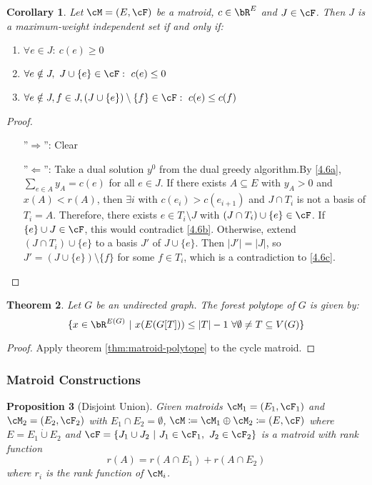 \documentclass[11pt, a4paper]{article}
\newcommand{\abs}[1]{\left\lvert#1\right\rvert}
\newcommand{\set}[1]{\{#1\}}
\newtheorem{theorem}{Theorem}[section]
\newtheorem{cor}[theorem]{Corollary}
\newtheorem{prop}[theorem]{Proposition}
\theoremstyle{remark}
\theoremstyle{definition}
\begin{document}
\begin{cor}
	Let $\cM=(E,\cF)$ be a matroid, $c\in\bR^E$ and $J\in\cF$. Then $J$ is
	a maximum-weight independent set if and only if:
	\begin{enumerate}[label=\alph*)]
		\item\label{4.6a} $\forall e\in J:\ c(e)\geq0$
		\item\label{4.6b} $\forall e\notin J,\ J\cup\set{e}\in\cF:\ c(e)\leq0$
		\item\label{4.6c} $\forall e\notin J, f\in J, (J\cup\set{e})\setminus\set{f}\in\cF:
			\ c(e)\leq c(f)$
	\end{enumerate}
\end{cor}
\begin{proof}\
	\begin{enumerate}
		\item[''$\Rightarrow$'':] Clear
		\item[''$\Leftarrow$'':] Take a dual solution $y^0$
		from the dual greedy algorithm.By \ref{4.6a}, $\sum_{e\in A}y_A=c(e)$
		for all $e\in J$. If there exists $A\subseteq E$ with $y_A>0$ and
		$x(A)<r(A)$, then $\exists i$ with $c(e_i)>c(e_{i+1})$ and
		$J\cap T_i$ is not a basis of $T_i=A$. Therefore, there exists
		$e\in T_i\setminus J$ with $(J\cap T_i)\cup\set{e}\in \cF$. If
		$\set{e}\cup J\in\cF$, this would contradict \ref{4.6b}. Otherwise,
		extend $(J\cap T_i)\cup\set{e}$ to a basis $J'$ of $J\cup\set{e}$. Then
		$\abs{J'}=\abs{J}$, so $J'=(J\cup\set{e})\setminus\set{f}$ for some
		$f\in T_i$, which is a contradiction to \ref{4.6c}.
	\end{enumerate}
\end{proof}


\begin{theorem}
	Let $G$ be an undirected graph. The forest polytope of $G$ is given by:
	\[\set{x\in\bR^{E(G)}\ |\ x(E(G[T]))\leq \abs{T}-1\ \forall \emptyset\neq T\subseteq V(G)}\]
\end{theorem}
\begin{proof}
	Apply theorem \ref{thm:matroid-polytope} to the cycle matroid.
\end{proof}

\subsubsection{Matroid Constructions}
\begin{prop}[Disjoint Union]
	Given matroids $\cM_1=(E_1,\cF_1)$ and $\cM_2=(E_2,\cF_2)$ with $E_1\cap
		E_2=\emptyset$, $\cM\coloneqq \cM_1\oplus \cM_2\coloneqq (E,\cF)$ where
	$E=E_1 \dot\cup E_2$ and $\cF=\set{J_1\cup J_2\ |\ J_1\in \cF_1,\ J_2\in\cF_2}$
	is a matroid with rank function
	\[r(A)=r(A\cap E_1)+r(A\cap E_2)\]
	where $r_i$ is the rank function of $\cM_i$.
\end{prop}
\end{document}
